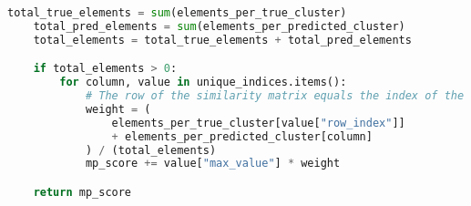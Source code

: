 \begin{lstlisting}[language=Python, caption=Calculate the MP-Score between two clusterings., label={lst:select_max_values}]
    total_true_elements = sum(elements_per_true_cluster)
    total_pred_elements = sum(elements_per_predicted_cluster)
    total_elements = total_true_elements + total_pred_elements

    if total_elements > 0:
        for column, value in unique_indices.items():
            # The row of the similarity matrix equals the index of the true cluster, while the column is the index of the predicted cluster
            weight = (
                elements_per_true_cluster[value["row_index"]]
                + elements_per_predicted_cluster[column]
            ) / (total_elements)
            mp_score += value["max_value"] * weight

    return mp_score
\end{lstlisting}
